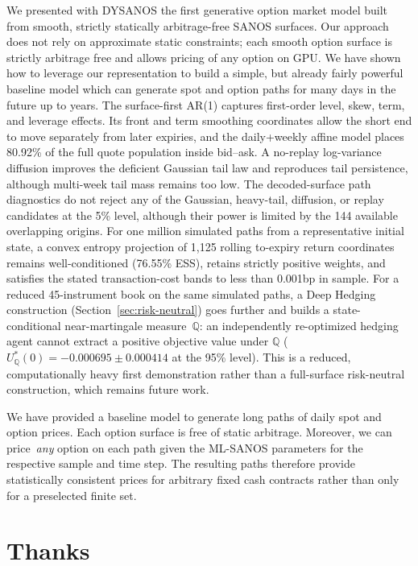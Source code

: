 \documentclass[11pt,a4paper]{article}
\newcommand{\Q}{\mathbb{Q}}
\renewcommand{\Q}{\mathbb{Q}}
\begin{document}
We presented with DYSANOS the first generative option market model built from
smooth, strictly statically arbitrage-free SANOS surfaces. Our approach does not rely on
approximate static constraints; each smooth option surface is strictly arbitrage free and allows
pricing of any option on GPU. We have shown how
to leverage our representation to build a simple, but already fairly powerful baseline
model which can generate spot and option paths for many days in the future up to years.
The surface-first AR(1) captures first-order level, skew, term, and leverage
effects.  Its front and term smoothing coordinates allow the short end to move
separately from later expiries, and the daily+weekly affine model places
80.92\% of the full quote population inside bid--ask.  A no-replay
log-variance diffusion improves the deficient Gaussian
tail law and reproduces tail persistence, although multi-week tail mass
remains too low.  The decoded-surface path diagnostics do not reject any of
the Gaussian, heavy-tail, diffusion, or replay candidates at the 5\% level,
although their power is limited by the 144 available overlapping origins.
For one million simulated paths from a representative initial state, a convex
entropy projection of 1,125 rolling to-expiry return coordinates remains
well-conditioned (76.55\% ESS), retains strictly positive weights, and
satisfies the stated transaction-cost bands to less than 0.001bp in sample.
For a reduced 45-instrument book on the same simulated paths, a Deep Hedging
construction (Section~\ref{sec:risk-neutral}) goes further and builds a
state-conditional near-martingale measure~$\Q$: an independently re-optimized
hedging agent cannot extract a positive objective value under $\Q$
($U_\Q^*(0)=-0.000695\pm0.000414$ at the 95\% level).  This is a reduced,
computationally heavy first demonstration rather than a full-surface
risk-neutral construction, which remains future work.

We have provided a baseline model to generate long paths of daily spot and option prices.
Each option surface is free of static arbitrage. Moreover, we can price~\emph{any}
option on each path given the ML-SANOS parameters for the respective sample and
time step.  The resulting paths therefore provide statistically consistent
prices for arbitrary fixed cash contracts rather than only for a preselected
finite set.

\section{Thanks}
\end{document}

